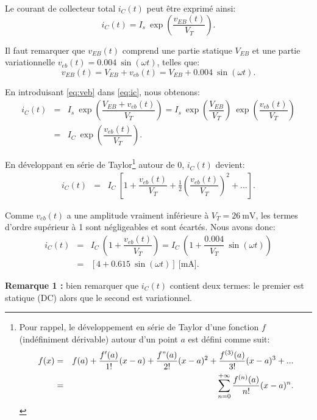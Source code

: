 \documentclass[frenchb,DIV=13]{scrartcl}
\begin{document}
Le courant de collecteur total $i_C(t)$ peut être exprimé ainsi:
\begin{equation}
	i_C(t) = I_s ~ \exp\left(\dfrac{v_{EB}(t)}{V_T}\right).\label{eq:ic}
\end{equation}

Il faut remarquer que $v_{EB}(t)$ comprend une partie statique $V_{EB}$ et une partie
variationnelle $v_{eb}(t) = 0.004~\sin\left(\omega t\right)$, telles que:
\begin{equation}
	v_{EB}(t) = V_{EB} + v_{eb}(t) = V_{EB} + 0.004~\sin\left(\omega t\right).\label{eq:veb}
\end{equation}

En introduisant \eqref{eq:veb} dans \eqref{eq:ic}, nous obtenons:
\begin{eqnarray}
	i_C(t) &=& I_s ~ \exp\left(\dfrac{V_{EB} + v_{eb}(t)}{V_T}\right) = I_s ~ \exp\left(\dfrac{V_{EB}}{V_T}\right) ~\exp\left(\dfrac{v_{eb}(t)}{V_T}\right)\\
	&=& I_C~ \exp\left(\dfrac{v_{eb}(t)}{V_T}\right).
\end{eqnarray}

En développant en série de Taylor\footnote{Pour rappel, le développement en série de Taylor d'une fonction
$f$ (indéfiniment dérivable) autour d'un point $a$ est défini comme suit:
\begin{eqnarray}
f(x) &=& f(a) + \dfrac{f'(a)}{1!}(x-a) + \dfrac{f"(a)}{2!}(x-a)^2 + \dfrac{f^{(3)}(a)}{3!}(x-a)^3 + ... \\&=& \sum_{n=0}^{+\infty} \dfrac{f^{(n)}(a)}{n!}(x-a)^n.
\end{eqnarray}
} autour de 0, $i_C(t)$ devient:
\begin{eqnarray}
	i_C(t) &=& I_C ~ \left[ 1 + \dfrac{v_{eb}(t)}{V_T} + \frac{1}{2}\left(\dfrac{v_{eb}(t)}{V_T}\right)^2 + ...\right].
\end{eqnarray}

Comme $v_{eb}(t)$ a une amplitude vraiment inférieure à $V_T = 26~\mbox{mV}$, les termes d'ordre supérieur
à 1 sont négligeables et sont écartés. Nous avons donc:
\begin{eqnarray}
	i_C(t) &=& I_C ~ \left(1 + \dfrac{v_{eb}(t)}{V_T}\right) = I_C ~ \left(1 + \dfrac{0.004}{V_T}~\sin\left(\omega t\right)\right) \\
	&=& \left[4 + 0.615~\sin\left(\omega t\right)\right] ~\mbox{[mA]}.
\end{eqnarray}

\textbf{Remarque 1 :} bien remarquer que $i_C(t)$ contient deux termes: le premier est statique (DC)
alors que le second est variationnel.\\
\end{document}
